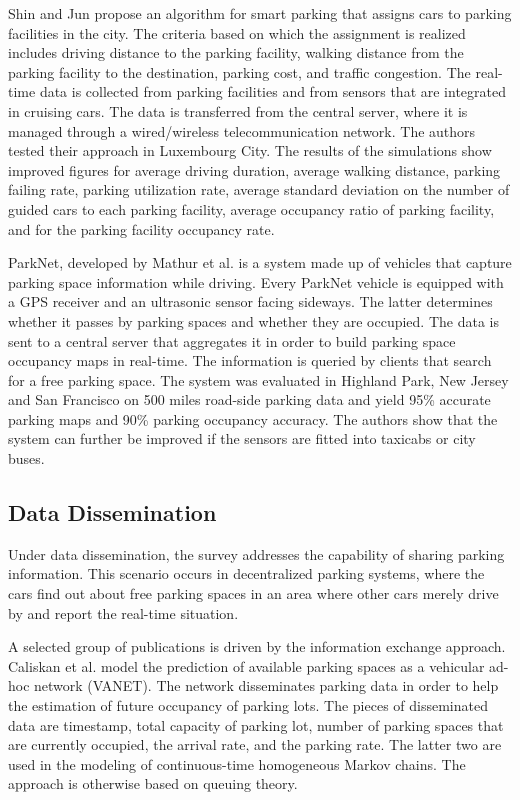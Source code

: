 	Shin and Jun\cite{shin} propose an algorithm for smart parking that assigns cars to parking facilities in the city. The criteria based on which the assignment is realized includes driving distance to the parking facility, walking distance from the parking facility to the destination, parking cost, and traffic congestion. The real-time data is collected from parking facilities and from sensors that are integrated in cruising cars. The data is transferred from the central server, where it is managed through a wired/wireless telecommunication network. The authors tested their approach in Luxembourg City. The results of the simulations show improved figures for average driving duration, average walking distance, parking failing rate, parking utilization rate, average standard deviation on the number of guided cars to each parking facility, average occupancy ratio of parking facility, and for the parking facility occupancy rate. 
	
	ParkNet, developed by Mathur et al.\cite{mathur} is a system made up of vehicles that capture parking space information while driving. Every ParkNet vehicle is equipped with a GPS receiver and an ultrasonic sensor facing sideways. The latter determines whether it passes by parking spaces and whether they are occupied. The data is sent to a central server that aggregates it in order to build parking space occupancy maps in real-time. The information is queried by clients that search for a free parking space. The system was evaluated in Highland Park, New Jersey and San Francisco on 500 miles road-side parking data and yield 95\% accurate parking maps and 90\% parking occupancy accuracy. The authors show that the system can further be improved if the sensors are fitted into taxicabs or city buses.
	
	\subsection{Data Dissemination}
	Under data dissemination, the survey\cite{lin} addresses the capability of sharing parking information. This scenario occurs in decentralized parking systems, where the cars find out about free parking spaces in an area where other cars merely drive by and report the real-time situation. 
	
	A selected group of publications is driven by the information exchange approach. Caliskan et al.\cite{caliskan} model the prediction of available parking spaces as a vehicular ad-hoc network (VANET). The network disseminates parking data in order to help the estimation of future occupancy of parking lots. The pieces of disseminated data are timestamp, total capacity of parking lot, number of parking spaces that are currently occupied, the arrival rate, and the parking rate. The latter two are used in the modeling of continuous-time homogeneous Markov chains. The approach is otherwise based on queuing theory. 
	
